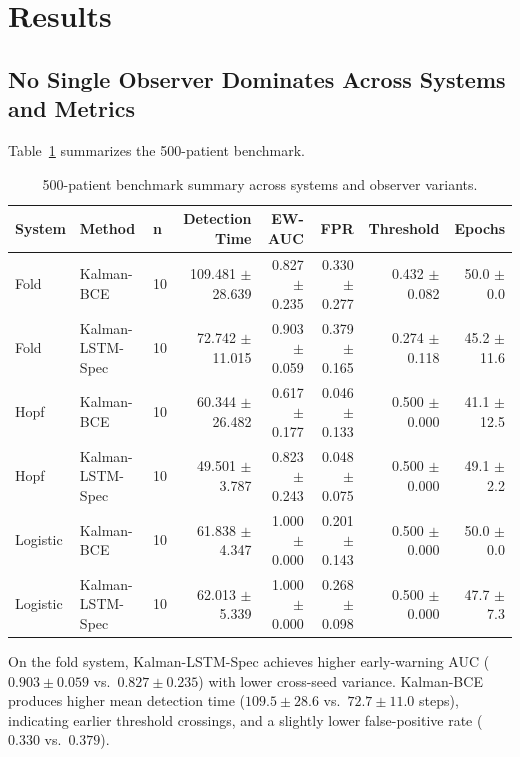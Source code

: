 \section{Results}
\label{sec:results}

\subsection{No Single Observer Dominates Across Systems and Metrics}
\label{sec:results:overview}

Table~\ref{tab:benchmark_500} summarizes the 500-patient benchmark.

\begin{table}[htbp]
  \centering
  \caption{500-patient benchmark summary across systems and observer variants.}
  \label{tab:benchmark_500}
  \begin{tabular}{lllrrrrr}
    \toprule
    System & Method & n & Detection Time & EW-AUC & FPR & Threshold & Epochs \\
    \midrule
    Fold & Kalman-BCE & 10 & 109.481 $\pm$ 28.639 & 0.827 $\pm$ 0.235 & 0.330 $\pm$ 0.277 & 0.432 $\pm$ 0.082 & 50.0 $\pm$ 0.0 \\
    Fold & Kalman-LSTM-Spec & 10 & 72.742 $\pm$ 11.015 & 0.903 $\pm$ 0.059 & 0.379 $\pm$ 0.165 & 0.274 $\pm$ 0.118 & 45.2 $\pm$ 11.6 \\
    Hopf & Kalman-BCE & 10 & 60.344 $\pm$ 26.482 & 0.617 $\pm$ 0.177 & 0.046 $\pm$ 0.133 & 0.500 $\pm$ 0.000 & 41.1 $\pm$ 12.5 \\
    Hopf & Kalman-LSTM-Spec & 10 & 49.501 $\pm$ 3.787 & 0.823 $\pm$ 0.243 & 0.048 $\pm$ 0.075 & 0.500 $\pm$ 0.000 & 49.1 $\pm$ 2.2 \\
    Logistic & Kalman-BCE & 10 & 61.838 $\pm$ 4.347 & 1.000 $\pm$ 0.000 & 0.201 $\pm$ 0.143 & 0.500 $\pm$ 0.000 & 50.0 $\pm$ 0.0 \\
    Logistic & Kalman-LSTM-Spec & 10 & 62.013 $\pm$ 5.339 & 1.000 $\pm$ 0.000 & 0.268 $\pm$ 0.098 & 0.500 $\pm$ 0.000 & 47.7 $\pm$ 7.3 \\
    \bottomrule
  \end{tabular}
\end{table}

On the fold system, Kalman-LSTM-Spec achieves higher early-warning AUC
(\(0.903 \pm 0.059\) vs.\ \(0.827 \pm 0.235\)) with lower cross-seed variance.
Kalman-BCE produces higher mean detection time (\(109.5 \pm 28.6\) vs.\
\(72.7 \pm 11.0\) steps), indicating earlier threshold crossings, and a
slightly lower false-positive rate (\(0.330\) vs.\ \(0.379\)).

